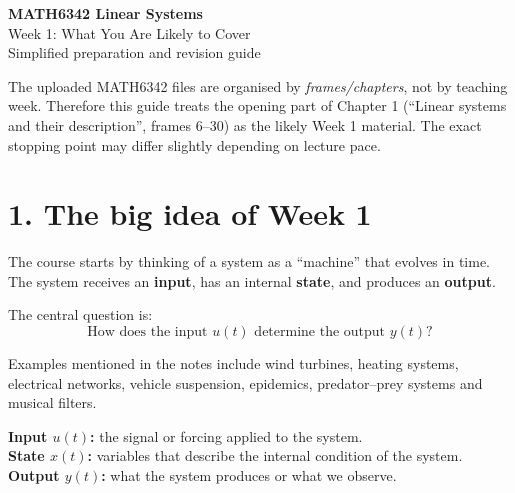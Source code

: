 \documentclass[11pt,a4paper]{article}
\begin{document}
\begin{center}
{\Huge\bfseries\color{navy} MATH6342 Linear Systems}\\[4pt]
{\LARGE Week 1: What You Are Likely to Cover}\\[8pt]
{\large Simplified preparation and revision guide}
\end{center}

\begin{note}[Important]
The uploaded MATH6342 files are organised by \emph{frames/chapters}, not by teaching week. Therefore this guide treats the opening part of Chapter 1 (``Linear systems and their description'', frames 6--30) as the likely Week 1 material. The exact stopping point may differ slightly depending on lecture pace.
\end{note}

\section{1. The big idea of Week 1}

The course starts by thinking of a system as a ``machine'' that evolves in time. The system receives an \textbf{input}, has an internal \textbf{state}, and produces an \textbf{output}.

\begin{center}
\end{center}

The central question is:
\[
\boxed{\text{How does the input }u(t)\text{ determine the output }y(t)?}
\]

Examples mentioned in the notes include wind turbines, heating systems, electrical networks, vehicle suspension, epidemics, predator--prey systems and musical filters.

\begin{keybox}
\textbf{Input $u(t)$:} the signal or forcing applied to the system.\\
\textbf{State $x(t)$:} variables that describe the internal condition of the system.\\
\textbf{Output $y(t)$:} what the system produces or what we observe.
\end{keybox}
\end{document}
